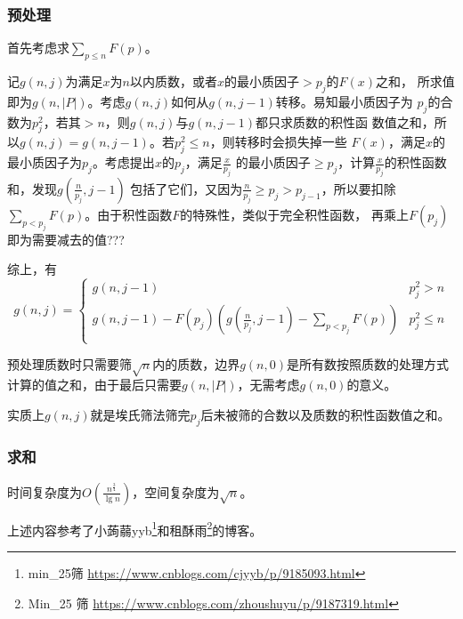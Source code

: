 \subsubsection{预处理}
首先考虑求$\displaystyle \sum_{p\leq n}{F(p)}$。

记$g(n,j)$为满足$x$为$n$以内质数，或者$x$的最小质因子$>p_j$的$F(x)$之和，
所求值即为$g(n,|P|)$。考虑$g(n,j)$如何从$g(n,j-1)$转移。易知最小质因子为
$p_j$的合数为$p_j^2$，若其$>n$，则$g(n,j)$与$g(n,j-1)$都只求质数的积性函
数值之和，所以$g(n,j)=g(n,j-1)$。若$p_j^2\leq n$，则转移时会损失掉一些
$F(x)$，满足$x$的最小质因子为$p_j$。考虑提出$x$的$p_j$，满足$\frac{x}{p_j}$
的最小质因子$\geq p_j$，计算$\frac{x}{p_j}$的积性函数和，发现$g(\frac{n}{p_j},j-1)$
包括了它们，又因为$\frac{n}{p_j}\geq p_j > p_{j-1}$，所以要扣除
$\displaystyle \sum_{p<p_j}F(p)$。由于积性函数$F$的特殊性，类似于完全积性函数，
再乘上$F(p_j)$即为需要减去的值???


综上，有\begin{displaymath}
	g(n,j)=\left\{\begin{array}{lr}
		g(n,j-1)        & p_j^2>n   \\
		g(n,j-1)-F(p_j)(g(\frac{n}{p_j},j-1)-\sum_{p<p_j}{F(p)}) & p_j^2\leq n \\
	\end{array}\right.
\end{displaymath}

预处理质数时只需要筛$\sqrt{n}$内的质数，边界$g(n,0)$是所有数按照质数的处理方式
计算的值之和，由于最后只需要$g(n,|P|)$，无需考虑$g(n,0)$的意义。

实质上$g(n,j)$就是埃氏筛法筛完$p_j$后未被筛的合数以及质数的积性函数值之和。
\subsubsection{求和}

时间复杂度为$O(\frac{n^\frac{3}{4}}{\lg n})$，空间复杂度为$\sqrt{n}$。

上述内容参考了小蒟蒻yyb\footnote{
	min\_25筛
	\url{https://www.cnblogs.com/cjyyb/p/9185093.html}
}和租酥雨\footnote{
	Min\_25 筛
	\url{https://www.cnblogs.com/zhoushuyu/p/9187319.html}
}的博客。
